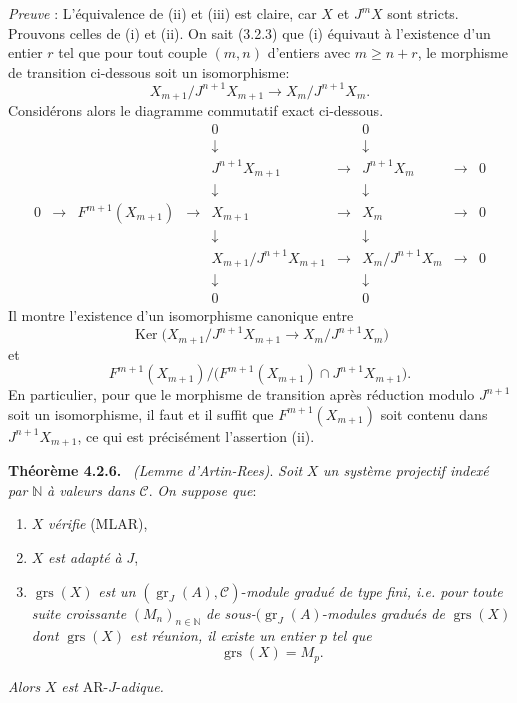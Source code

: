 \documentclass[11pt]{article}
\newenvironment{statement}[1]{\par\medskip\noindent\textbf{#1.}\ }{\par\medskip}
\providecommand{\Ker}{\operatorname{Ker}}
\providecommand{\gr}{\operatorname{gr}}
\providecommand{\Ker}{\operatorname{Ker}}
\providecommand{\gr}{\operatorname{gr}}
\providecommand{\gr}{\operatorname{gr}}
\providecommand{\grs}{\operatorname{grs}}
\providecommand{\Ker}{\operatorname{Ker}}
\begin{document}
\emph{Preuve} : L'équivalence de (ii) et (iii) est claire, car \(X\) et \(J^mX\) sont stricts. Prouvons celles de (i) et (ii). On sait (3.2.3) que (i) équivaut à l'existence d'un entier \(r\) tel que pour tout couple \((m,n)\) d'entiers avec \(m\ge n+r\), le morphisme de transition ci-dessous soit un isomorphisme:
\[
X_{m+1}/J^{n+1}X_{m+1}\longrightarrow X_m/J^{n+1}X_m.
\]
Considérons alors le diagramme commutatif exact ci-dessous.
\[
\begin{array}{ccccccccccc}
&&&&0&&0\\
&&&&\downarrow&&\downarrow\\
&&&&J^{n+1}X_{m+1}&\longrightarrow&J^{n+1}X_m&\longrightarrow&0\\
&&&&\downarrow&&\downarrow\\
0&\longrightarrow&F^{m+1}(X_{m+1})&\longrightarrow&X_{m+1}&\longrightarrow&X_m&\longrightarrow&0\\
&&&&\downarrow&&\downarrow\\
&&&&X_{m+1}/J^{n+1}X_{m+1}&\longrightarrow&X_m/J^{n+1}X_m&\longrightarrow&0\\
&&&&\downarrow&&\downarrow\\
&&&&0&&0
\end{array}
\]
Il
montre l'existence d'un isomorphisme canonique entre
\[
\Ker\bigl(X_{m+1}/J^{n+1}X_{m+1}
       \longrightarrow X_m/J^{n+1}X_m\bigr)
\]
et
\[
F^{m+1}(X_{m+1})/
\bigl(F^{m+1}(X_{m+1})\cap J^{n+1}X_{m+1}\bigr).
\]
En particulier, pour que le morphisme de transition après réduction modulo \(J^{n+1}\) soit un isomorphisme, il faut et il suffit que \(F^{m+1}(X_{m+1})\) soit contenu dans \(J^{n+1}X_{m+1}\), ce qui est précisément l'assertion (ii).

\begin{statement}{Théorème 4.2.6}
\emph{(Lemme d'Artin-Rees)}. \emph{Soit} \(X\) \emph{un système projectif indexé par} \(\mathbb N\) \emph{à valeurs dans} \(\mathcal C\). \emph{On suppose que}:
\begin{enumerate}[label=\textup{(\roman*)}]
\item \(X\) \emph{vérifie} (MLAR),
\item \(X\) \emph{est adapté à} \(J\),
\item \(\grs(X)\) \emph{est un} \((\gr_J(A),\mathcal C)\)-\emph{module gradué de type fini, i.e. pour toute suite croissante} \((M_n)_{n\in\mathbb N}\) \emph{de sous-}\((\gr_J(A)\)-\emph{modules gradués de} \(\grs(X)\) \emph{dont} \(\grs(X)\) \emph{est réunion, il existe un entier} \(p\) \emph{tel que}
\[
\grs(X)=M_p.
\]
\end{enumerate}
\emph{Alors} \(X\) \emph{est} AR-\(J\)-\emph{adique.}
\end{statement}
\end{document}
